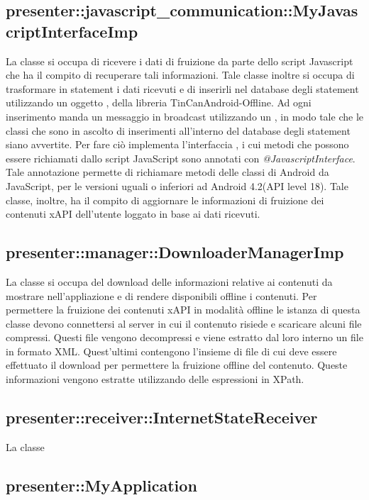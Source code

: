 \documentclass[../Tesi.tex]{subfiles}
\begin{document}
		\subsection{presenter::javascript\_communication::MyJavascriptInterfaceImp}
		La classe  si occupa di ricevere i dati di fruizione da parte dello script Javascript che ha il compito di recuperare tali informazioni. Tale classe inoltre si occupa di trasformare in statement i dati ricevuti e di inserirli nel database degli statement utilizzando un oggetto , della libreria TinCanAndroid-Offline. Ad ogni inserimento manda un messaggio in broadcast utilizzando un , in modo tale che le classi che sono in ascolto di inserimenti all'interno del database degli statement siano avvertite. Per fare ciò implementa l'interfaccia , i cui metodi che possono essere richiamati dallo script JavaScript sono annotati con \textit{@JavascriptInterface}. Tale annotazione permette di richiamare metodi delle classi di Android da JavaScript, per le versioni uguali o inferiori ad Android 4.2(API level 18). Tale classe, inoltre, ha il compito di aggiornare le informazioni di fruizione dei contenuti xAPI dell'utente loggato in base ai dati ricevuti. 

		\subsection{presenter::manager::DownloaderManagerImp}
		La classe  si occupa del download delle informazioni relative ai contenuti da mostrare nell'appliazione e di rendere disponibili offline i contenuti. Per permettere la fruizione dei contenuti xAPI in modalità offline le istanza di questa classe devono connettersi al server in cui il contenuto risiede e scaricare alcuni file compressi. Questi file vengono decompressi e viene estratto dal loro interno un file in formato XML. Quest'ultimi contengono l'insieme di file di cui deve essere effettuato il download per permettere la fruizione offline del contenuto. Queste informazioni vengono estratte utilizzando delle espressioni in XPath. 

		\subsection{presenter::receiver::InternetStateReceiver}
		La classe  

		\subsection{presenter::MyApplication}
\end{document}
